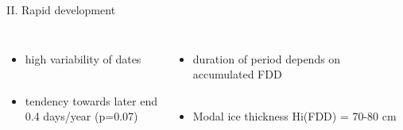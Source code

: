 \documentclass[8pt]{beamer}
\begin{document}
\begin{frame}[fragile]{II. Rapid development}
	\begin{columns}
		\begin{itemize}
			\item{high variability of dates}\\~\\
			\item{tendency towards later end \\ 0.4 days/year (p=0.07)\\}
		\end{itemize}
		\begin{itemize}
			\item{duration of period depends on\\ accumulated FDD}\\~\\
			\item{Modal ice thickness Hi(FDD) = 70-80 cm}
		\end{itemize}
	\end{columns}
\end{frame}
\end{document}
